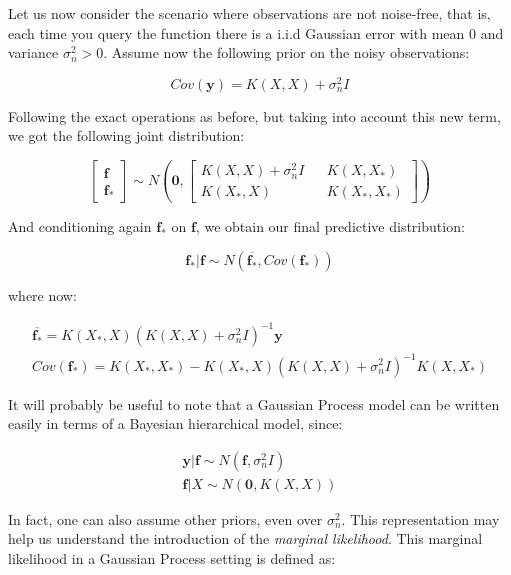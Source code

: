\documentclass[10pt,a4paper,twoside]{book}
\begin{document}
Let us now consider the scenario where observations are not noise-free, that is, each time you query the function there is a i.i.d Gaussian error with mean $0$ and variance $\sigma_n^2 > 0$. Assume now the following prior on the noisy observations:

\begin{equation}
Cov(\boldsymbol{y}) = K(X, X) + \sigma^2_n I 
\end{equation}

Following the exact operations as before, but taking into account this new term, we got the following joint distribution:

\begin{equation}
\begin{bmatrix}
\boldsymbol{f}\\
\boldsymbol{f_*}
\end{bmatrix} \sim N\left(
\boldsymbol{0},
\begin{bmatrix}
K(X, X) + \sigma^2_n I && K(X, X_*) \\
K(X_*, X) && K(X_*, X_*)
\end{bmatrix}
\right)
\end{equation}

And conditioning again $\boldsymbol{f_{*}}$ on $\boldsymbol{f}$, we obtain our final predictive distribution:

\begin{equation}
\boldsymbol{f_*|f} \sim N(\boldsymbol{\overline{f_*}},  Cov(\boldsymbol{f_*}))
\end{equation}

where now:

\begin{align}
\boldsymbol{\overline{f_*}} = K(X_*, X)\left(K(X, X) + \sigma^2_n I   \right)^{-1}\boldsymbol{y}\\
Cov(\boldsymbol{f_*}) = K(X_*, X_*) - K(X_*, X)\left(K(X, X) + \sigma_n^2 I \right)^{-1}K(X, X_*)
\end{align}

It will probably be useful to note that a Gaussian Process model can be written easily in terms of a Bayesian hierarchical model, since:

\begin{align}
\label{hierarchical}
\boldsymbol{y}|\boldsymbol{f} \sim N(\boldsymbol{f}, \sigma^2_n I)\\
\label{hierarchical2}
\boldsymbol{f}|X \sim N(\boldsymbol{0}, K(X, X))
\end{align}

In fact, one can also assume other priors, even over $\sigma_n^2$. This representation may help us understand the introduction of the \textit{marginal likelihood}. This marginal likelihood in a Gaussian Process setting is defined as:
\end{document}
